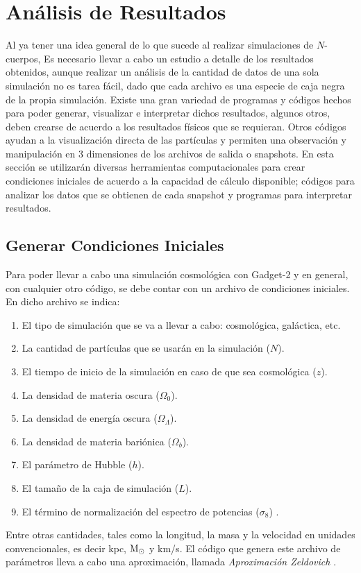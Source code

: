 \documentclass[a4paper,openright,12pt]{book}
\begin{document}
\chapter{Análisis de Resultados}
Al ya tener una idea general de lo que sucede al realizar simulaciones de $N$-cuerpos, Es necesario llevar a cabo un estudio a detalle de los resultados obtenidos, aunque realizar un análisis de la cantidad de datos de una sola simulación no es tarea fácil, dado que cada archivo es una especie de caja negra de la propia simulación. Existe una gran variedad de programas y códigos hechos para poder generar, visualizar e interpretar dichos resultados, algunos otros, deben crearse de acuerdo a los resultados físicos que se requieran. Otros códigos ayudan a la visualización directa de las partículas y permiten una observación  y manipulación en 3 dimensiones de los archivos de salida o \textsf{snapshots}. En esta sección se utilizarán diversas herramientas computacionales para crear condiciones iniciales de acuerdo a la capacidad de cálculo disponible; códigos para analizar los datos que se obtienen de cada \textsf{snapshot} y programas para interpretar resultados.

\section{Generar Condiciones Iniciales}
Para poder llevar a cabo una simulación cosmológica con Gadget-2 y en general, con cualquier otro código, se debe contar con un archivo de condiciones iniciales. En dicho archivo se indica:
\begin{enumerate}
\item El tipo de simulación que se va a llevar a cabo: cosmológica, galáctica, etc.
\item La cantidad de partículas que se usarán en la simulación ($N$).
\item El tiempo de inicio de la simulación en caso de que sea cosmológica ($z$).
\item La densidad de materia oscura ($\Omega_{0}$).
\item La densidad de energía oscura ($\Omega_{\Lambda}$).
\item La densidad de materia bariónica ($\Omega_{b}$).
\item El parámetro de Hubble ($h$).
\item El tamaño de la caja de simulación ($L$).
\item El término de normalización del espectro de potencias ($\sigma_{8}$) \cite{4.0}.
\end{enumerate}
Entre otras cantidades, tales como la longitud, la masa y la velocidad en unidades convencionales, es decir kpc, $\textup M_{\odot}$ y km/s. El código que genera este archivo de parámetros lleva a cabo una aproximación, llamada \textit{Aproximación Zeldovich} \cite{4.1, 4.2}. 
\end{document}
